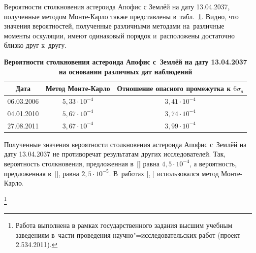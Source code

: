 Вероятности столкновения астероида Апофис с Землёй на дату 13.04.2037, полученные методом Монте-Карло также представлены в~табл.~\ref{derev:tablRes}. Видно, что значения вероятностей, полученные различными методами на~различные моменты оскуляции,  имеют одинаковый порядок и~расположены достаточно близко друг к~другу.

\begin{table}[t!]
	\center \footnotesize
	\caption{\textbf{Вероятности столкновения астероида Апофис с~Землёй на дату 13.04.2037   на основании различных дат наблюдений }}
\vspace{-3mm}
	\label{derev:tablRes}
	\setlength{\tabcolsep}{16pt}
\begin{tabular}[h]{c|c|c}\hline
\scriptsize
Дата &
\scriptsize
Метод Монте-Карло& 
\scriptsize
Отношение опасного промежутка к $6\sigma_{a}$\\\hline
\rule{0mm}{12pt}%
			06.03.2006&$5,33 \cdot 10^{-4}$& {$3,41 \cdot 10^{-4}$}\\
			04.01.2010&$5,67 \cdot 10^{-4}$& {$3,74 \cdot 10^{-4}$}\\
			27.08.2011&$3,67 \cdot 10^{-4}$& {$3,99 \cdot 10^{-4}$}\\\hline
			\end{tabular}
\vspace{-5mm}
\end{table}

Полученные значения вероятности столкновения астероида Апофис с~Землёй на дату 13.04.2037 не противоречат результатам других исследователей. Так, вероятность столкновения, предложенная в~[] равна $4,5\cdot 10^{-4}$, а вероятность, предложенная в~[], равна $2,5\cdot 10^{-5}$.
В~работах [, ] использовался метод Монте-Карло. 


\thanks{Работа выполнена в рамках государственного задания высшим учебным заведениям в~части проведения
научно"=исследовательских работ (проект 2.534.2011).}

